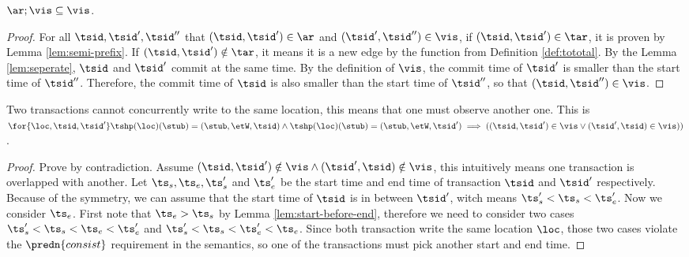 \begin{lem}[Prefix]
    \label{lem:prefix}
    \( \ar; \vis \subseteq \vis \).
\end{lem}
\begin{proof}
    For all \( \tsid, \tsid', \tsid'' \) that \( (\tsid, \tsid') \in \ar \) and \( (\tsid', \tsid'') \in \vis \), if \( (\tsid, \tsid') \in \tar \), it is proven by Lemma \ref{lem:semi-prefix}.
    If \( ( \tsid, \tsid' ) \notin \tar \), it means it is a new edge by the  function from Definition \ref{def:tototal}.
    By the Lemma \ref{lem:seperate}, \( \tsid \) and \( \tsid' \) commit at the same time.
    By the definition of \( \vis \), the commit time of \( \tsid' \) is smaller than the start time of \( \tsid'' \).
    Therefore, the commit time of \( \tsid \) is also smaller than the start time of \( \tsid'' \), so that \( ( \tsid, \tsid'' ) \in \vis \).
\end{proof}

\begin{lem}[No conflict]
    \label{lem:nocoflict}
    Two transactions cannot concurrently write to the same location, this means that one must observe another one.
    This is \( \for{ \loc, \tsid, \tsid' } \tshp(\loc)(\stub) = (\stub, \etW, \tsid) \land  \tshp(\loc)(\stub) = (\stub, \etW, \tsid' ) \implies ((\tsid, \tsid') \in \vis \lor (\tsid', \tsid) \in \vis ))\).
\end{lem}
\begin{proof}
    Prove by contradiction.
    Assume \( (\tsid, \tsid') \notin \vis \land (\tsid', \tsid) \notin \vis \), this intuitively means one transaction is overlapped with another.
    Let \( \ts_{s}, \ts_{e}, \ts'_{s} \) and \( \ts'_{e} \) be the start time and end time of transaction \( \tsid \) and \( \tsid' \) respectively.
    Because of the symmetry,  we can assume that the start time of \( \tsid \) is in between \( \tsid' \), witch means \( \ts'_{s} < \ts_{s} < \ts'_{e} \).
    Now we consider \( \ts_{e} \).
    First note that \( \ts_{e} > \ts_{s} \) by Lemma \ref{lem:start-before-end}, therefore we need to consider two cases \( \ts'_{s} < \ts_{s} < \ts_{e} < \ts'_{e} \) and  \( \ts'_{s} < \ts_{s} < \ts'_{e} < \ts_{e}  \).
    Since both transaction write the same location \( \loc \), those two cases violate the \( \predn{consist} \) requirement in the semantics, so one of the transactions must pick another start and end time.
\end{proof}

